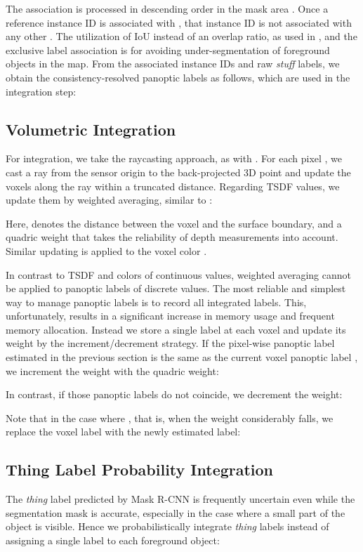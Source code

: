 \documentclass[letterpaper, 10pt, conference]{latex_template/ieeeconf}
\begin{document}
The association is processed in descending order in the mask area . Once a reference instance ID  is associated with , that instance ID is not associated with any other .
The utilization of IoU instead of an overlap ratio, as used in  \cite{runz2018maskfusion,mccormac2018fusion++}, and the exclusive label association is for avoiding under-segmentation of foreground objects in the map.
From the associated instance IDs and raw {\it stuff} labels, we obtain the consistency-resolved panoptic labels  as follows, which are used in the integration step:



\subsection{Volumetric Integration\label{sec_volumetric_integration}}
For integration, we take the raycasting approach, as with \cite{oleynikova2017voxblox}.
For each pixel , we cast a ray from the sensor origin  to the back-projected 3D point  and update the voxels along the ray within a truncated distance.
Regarding TSDF values, we update them by weighted averaging, similar to \cite{newcombe2011kinectfusion}:

Here,  denotes the distance between the voxel and the surface boundary, and  a quadric weight \cite{oleynikova2017voxblox} that takes the reliability of depth measurements into account.
Similar updating is applied to the voxel color .

In contrast to TSDF and colors of continuous values,  weighted averaging cannot be applied to panoptic labels of discrete values.
The most reliable and simplest way to manage panoptic labels is to record all integrated labels.
This, unfortunately, results in a significant increase in memory usage and frequent memory allocation.
Instead we store a single label at each voxel and update its weight by the increment/decrement strategy.
If the pixel-wise panoptic label  estimated in the previous section is the same as the current voxel panoptic label , we increment the weight  with the quadric weight:

In contrast, if those panoptic labels do not coincide, we decrement the weight:

Note that in the case where , that is, when the weight considerably falls, we replace the voxel label with the newly estimated label:


\subsection{Thing Label Probability Integration\label{sec_label_prob_integration}}
The {\it thing} label predicted by Mask R-CNN is frequently uncertain even while the segmentation mask is accurate, especially in the case where a small part of the object is visible.
Hence we probabilistically integrate {\it thing} labels instead of assigning a single label to each foreground object:
\end{document}

